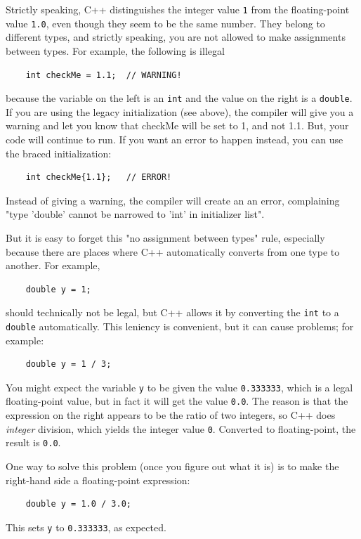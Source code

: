 Strictly speaking, C++ distinguishes the integer value {\tt 1}
from the floating-point value {\tt 1.0}, even though they
seem to be the same number.  They belong to
different types, and strictly speaking, you are not allowed
to make assignments between types.  For example, the following
is illegal

\begin{lstlisting}
    int checkMe = 1.1;  // WARNING!
\end{lstlisting}
%
because the variable on the left is an {\tt int}
and the value on the right is a {\tt double}. If you are
using the legacy initialization (see above), the compiler
will give you a warning and let you know that checkMe will
be set to 1, and not 1.1. But, your code will continue to
run. If you want an error to happen 
instead, you can use the braced initialization:
\begin{lstlisting}
    int checkMe{1.1};   // ERROR!
\end{lstlisting}
Instead of giving a warning, the compiler will create an
an error, complaining "type 'double' cannot be narrowed to 'int' in initializer list". 

But it is easy
to forget this "no assignment between types" rule, especially because there are places where C++
automatically converts from one type to another.
For example,

\begin{lstlisting}
    double y = 1;
\end{lstlisting}
%
should technically not be legal, but C++ allows it by converting the
{\tt int} to a {\tt double} automatically.  This leniency is
convenient, but it can cause problems; for example:

\begin{lstlisting}
    double y = 1 / 3;
\end{lstlisting}
%
You might expect the variable {\tt y} to be given the value
{\tt 0.333333}, which is a legal floating-point value, but in
fact it will get the value {\tt 0.0}.  The reason is that the
expression on the right appears to be the ratio of two integers,
so C++ does {\em integer} division, which yields the integer
value {\tt 0}.  Converted to floating-point, the result is
{\tt 0.0}.

One way to solve this problem (once you figure out what
it is) is to make the right-hand side a floating-point
expression:

\begin{lstlisting}
    double y = 1.0 / 3.0;
\end{lstlisting}
%
This sets {\tt y} to {\tt 0.333333}, as expected.

